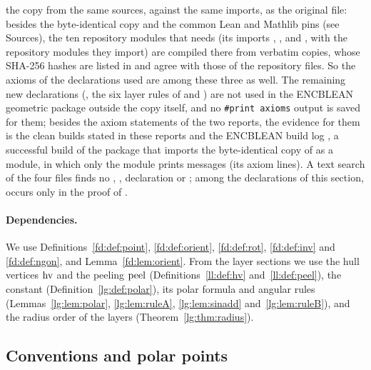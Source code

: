 the copy from the same sources, against the same imports, as the original file: besides the byte-identical copy
and the common Lean and Mathlib pins (see Sources), the ten repository modules that  needs
(its imports , ,
 and , with the repository
modules they import) are compiled there from verbatim copies, whose SHA-256 hashes are listed in
 and agree with those of the repository files. So the axioms of the declarations
used are among these three as well. The remaining new declarations (,
the six layer rules of  and ) are not
used in the ENCBLEAN geometric package outside the copy itself, and no \texttt{\#print axioms} output is saved
for them; besides the axiom statements of the two
reports, the evidence for them is the clean builds stated in these reports and the ENCBLEAN build log
, a successful build of the package that imports the byte-identical copy of
 as a module, in which only the  module prints messages (its axiom lines). A
text search of the four files finds no , , 
declaration or ; among the declarations of this section,  occurs only in the
proof of .

\paragraph{Dependencies.} We use Definitions~\ref{fd:def:point}, \ref{fd:def:orient}, \ref{fd:def:rot},
\ref{fd:def:inv} and \ref{fd:def:ngon}, and Lemma~\ref{fd:lem:orient}. From the layer sections we use the hull
vertices $\operatorname{hv}$ and the peeling $\operatorname{peel}$ (Definitions~\ref{ll:def:hv} and~\ref{ll:def:peel}), the constant
 (Definition~\ref{lg:def:polar}), its polar formula and angular rules
(Lemmas~\ref{lg:lem:polar}, \ref{lg:lem:ruleA}, \ref{lg:lem:sinadd} and~\ref{lg:lem:ruleB}), and the radius
order of the layers (Theorem~\ref{lg:thm:radius}).

\subsection{Conventions and polar points}

